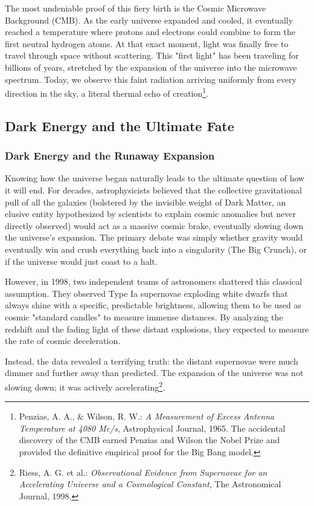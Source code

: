 \documentclass[10pt,a4paper]{article}
\begin{document}
The most undeniable proof of this fiery birth is the Cosmic Microwave Background (CMB). As the early universe expanded and cooled, it eventually reached a temperature where protons and electrons could combine to form the first neutral hydrogen atoms. At that exact moment, light was finally free to travel through space without scattering. This "first light" has been traveling for billions of years, stretched by the expansion of the universe into the microwave spectrum. Today, we observe this faint radiation arriving uniformly from every direction in the sky, a literal thermal echo of creation\footnote{Penzias, A. A., \& Wilson, R. W.: \textit{A Measurement of Excess Antenna Temperature at 4080 Mc/s}, Astrophysical Journal, 1965. The accidental discovery of the CMB earned Penzias and Wilson the Nobel Prize and provided the definitive empirical proof for the Big Bang model.}.

\subsection{Dark Energy and the Ultimate Fate}

\subsubsection{Dark Energy and the Runaway Expansion}
Knowing how the universe began naturally leads to the ultimate question of how it will end. For decades, astrophysicists believed that the collective gravitational pull of all the galaxies (bolstered by the invisible weight of Dark Matter, an elusive entity hypothesized by scientists to explain cosmic anomalies but never directly observed) would act as a massive cosmic brake, eventually slowing down the universe's expansion. The primary debate was simply whether gravity would eventually win and crush everything back into a singularity (The Big Crunch), or if the universe would just coast to a halt.

However, in 1998, two independent teams of astronomers shattered this classical assumption. They observed Type Ia supernovae exploding white dwarfs that always shine with a specific, predictable brightness, allowing them to be used as cosmic "standard candles" to measure immense distances. By analyzing the redshift and the fading light of these distant explosions, they expected to measure the rate of cosmic deceleration. 

Instead, the data revealed a terrifying truth: the distant supernovae were much dimmer and further away than predicted. The expansion of the universe was not slowing down; it was actively accelerating\footnote{Riess, A. G. et al.: \textit{Observational Evidence from Supernovae for an Accelerating Universe and a Cosmological Constant}, The Astronomical Journal, 1998.}.
\end{document}
